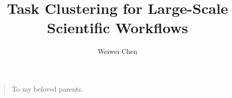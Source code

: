 \documentclass[final]{USC-Thesis}
\numberwithin{equation}{chapter}
\numberwithin{figure}{chapter}
\begin{document}

\title{Task Clustering for Large-Scale Scientific Workflows}

\author{Weiwei Chen}

\maketitle

  \begin{quote}
  To my beloved parents.
  \end{quote}


%

\newpage
\tableofcontents
\newpage
\listoftables
\newpage
{} \label{listoffig}
\listoffigures


  


\mainmatter

\let\oldacl=\addcontentsline
\def\addcontentsline#1#2#3{%
	\def\tempa{#1}
	\def\tempb{toc}
	\ifx\tempa\tempb
		\def\tempa{#2}\def\tempb{chapter}
		\ifx\tempa\tempb
			\oldacl{#1}{#2}{Chapter\space #3}%
		\else
			\oldacl{#1}{#2}{#3}%
		\fi
	\else
		\oldacl{#1}{#2}{#3}%
	\fi
}












%
%
%
\end{document}

